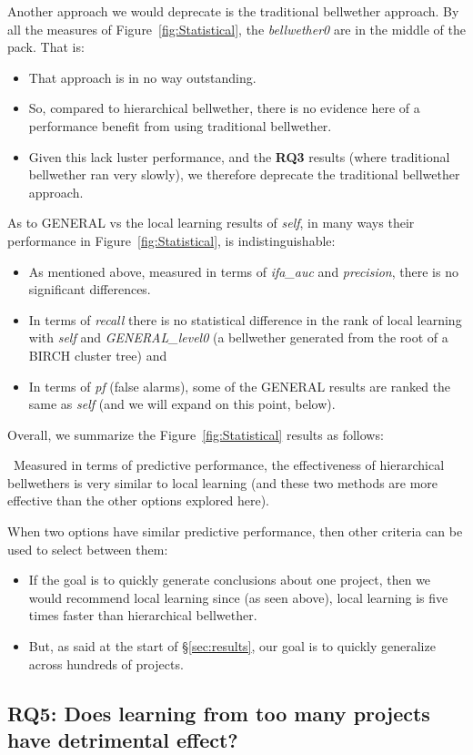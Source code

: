 \documentclass[10pt,journal,compsoc]{IEEEtran}
\newcommand{\bi}{\begin{itemize}}
\newcommand{\ei}{\end{itemize}}
\newenvironment{RQ}[1]%
{\noindent\begin{minipage}[c]{\linewidth}%
\begin{bclogo}[couleur=gray!20,%
                arrondi=0.1,logo=\bctrombone,%
                ombre=true%
                ]{{\small  ~#1}}}%
{\end{bclogo}\vspace{2mm}\end{minipage}}
\begin{document}
Another approach we would deprecate is the traditional bellwether approach.
By all the measures of
Figure~\ref{fig:Statistical},   the {\em bellwether0} are in the middle of the pack. That is:
\bi
\item
That approach is in no way outstanding. 
\item
So, 
compared to hierarchical bellwether,
 there is no evidence here of a performance
benefit from using  traditional bellwether.
\item
Given this lack luster performance, 
and   the {\bf RQ3} results (where traditional bellwether ran very slowly), we therefore  
deprecate the traditional bellwether approach.
 \ei
As to GENERAL vs the local learning results of {\em self}, in many ways their performance in  Figure~\ref{fig:Statistical},
is indistinguishable:
\bi
\item As mentioned above, measured in terms of {\em ifa\_auc}
and {\em precision}, there is no significant differences.
\item In terms of {\em recall} there is no statistical difference in the rank
of  local learning with {\em self} and 
  {\em GENERAL\_level0}
(a bellwether
generated from the root of a BIRCH cluster tree) and 
\item In terms of {\em pf} (false alarms), some of the GENERAL results are ranked
the same as {\em self} (and we will expand on this point, below).
\ei
Overall, we summarize the Figure~\ref{fig:Statistical} results as follows:



\begin{RQ}
{Measured in terms of predictive performance,
the effectiveness of hierarchical bellwethers
is very similar to local learning
(and these two methods are more effective
than the other options explored here). }
\end{RQ}

 
When two options have similar predictive
performance, then other criteria can be used
to select between them:
\bi
\item If the goal is to quickly generate
conclusions about one project, then we would recommend
local learning since (as seen above), local learning is five
times faster than hierarchical bellwether.
\item
But, as said at the start
of \S\ref{sec:results},
our goal is to quickly generalize across hundreds of
projects. 
\ei
 



\subsection*{RQ5: Does learning from too many projects have detrimental effect?}
\label{sec:rq5}
\end{document}
